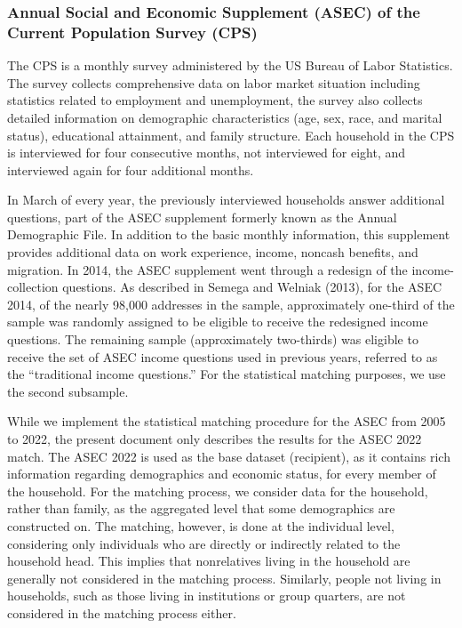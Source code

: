 \documentclass[
  11pt,
]{article}
\begin{document}
\subsubsection{Annual Social and Economic Supplement (ASEC) of the
Current Population Survey
(CPS)}\label{annual-social-and-economic-supplement-asec-of-the-current-population-survey-cps}

The CPS is a monthly survey administered by the US Bureau of Labor
Statistics. The survey collects comprehensive data on labor market
situation including statistics related to employment and unemployment,
the survey also collects detailed information on demographic
characteristics (age, sex, race, and marital status), educational
attainment, and family structure. Each household in the CPS is
interviewed for four consecutive months, not interviewed for eight, and
interviewed again for four additional months.

In March of every year, the previously interviewed households answer
additional questions, part of the ASEC supplement formerly known as the
Annual Demographic File. In addition to the basic monthly information,
this supplement provides additional data on work experience, income,
noncash benefits, and migration. In 2014, the ASEC supplement went
through a redesign of the income-collection questions. As described in
Semega and Welniak (2013), for the ASEC 2014, of the nearly 98,000
addresses in the sample, approximately one-third of the sample was
randomly assigned to be eligible to receive the redesigned income
questions. The remaining sample (approximately two-thirds) was eligible
to receive the set of ASEC income questions used in previous years,
referred to as the ``traditional income questions.'' For the statistical
matching purposes, we use the second subsample.

While we implement the statistical matching procedure for the ASEC from
2005 to 2022, the present document only describes the results for the
ASEC 2022 match. The ASEC 2022 is used as the base dataset (recipient),
as it contains rich information regarding demographics and economic
status, for every member of the household. For the matching process, we
consider data for the household, rather than family, as the aggregated
level that some demographics are constructed on. The matching, however,
is done at the individual level, considering only individuals who are
directly or indirectly related to the household head. This implies that
nonrelatives living in the household are generally not considered in the
matching process. Similarly, people not living in households, such as
those living in institutions or group quarters, are not considered in
the matching process either.
\end{document}
